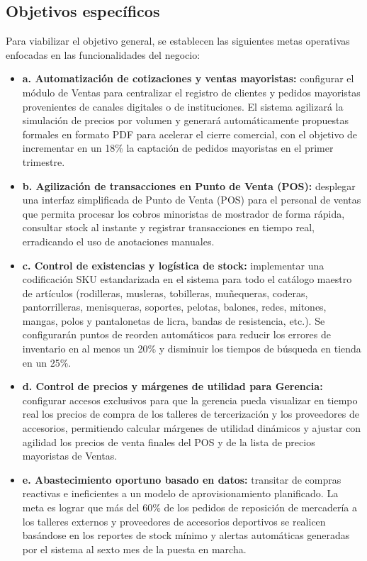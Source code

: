 \subsection{Objetivos específicos}
\begin{indentedsubsection}
Para viabilizar el objetivo general, se establecen las siguientes metas operativas enfocadas en las funcionalidades del negocio:

\begin{itemize}
    \item \textbf{a. Automatización de cotizaciones y ventas mayoristas:} configurar el módulo de Ventas para centralizar el registro de clientes y pedidos mayoristas provenientes de canales digitales o de instituciones. El sistema agilizará la simulación de precios por volumen y generará automáticamente propuestas formales en formato PDF para acelerar el cierre comercial, con el objetivo de incrementar en un 18\% la captación de pedidos mayoristas en el primer trimestre.
    \item \textbf{b. Agilización de transacciones en Punto de Venta (POS):} desplegar una interfaz simplificada de Punto de Venta (POS) para el personal de ventas que permita procesar los cobros minoristas de mostrador de forma rápida, consultar stock al instante y registrar transacciones en tiempo real, erradicando el uso de anotaciones manuales.
    \item \textbf{c. Control de existencias y logística de stock:} implementar una codificación SKU estandarizada en el sistema para todo el catálogo maestro de artículos (rodilleras, musleras, tobilleras, muñequeras, coderas, pantorrilleras, menisqueras, soportes, pelotas, balones, redes, mitones, mangas, polos y pantalonetas de licra, bandas de resistencia, etc.). Se configurarán puntos de reorden automáticos para reducir los errores de inventario en al menos un 20\% y disminuir los tiempos de búsqueda en tienda en un 25\%.
    \item \textbf{d. Control de precios y márgenes de utilidad para Gerencia:} configurar accesos exclusivos para que la gerencia pueda visualizar en tiempo real los precios de compra de los talleres de tercerización y los proveedores de accesorios, permitiendo calcular márgenes de utilidad dinámicos y ajustar con agilidad los precios de venta finales del POS y de la lista de precios mayoristas de Ventas.
    \item \textbf{e. Abastecimiento oportuno basado en datos:} transitar de compras reactivas e ineficientes a un modelo de aprovisionamiento planificado. La meta es lograr que más del 60\% de los pedidos de reposición de mercadería a los talleres externos y proveedores de accesorios deportivos se realicen basándose en los reportes de stock mínimo y alertas automáticas generadas por el sistema al sexto mes de la puesta en marcha.

\end{itemize}
\end{indentedsubsection}
